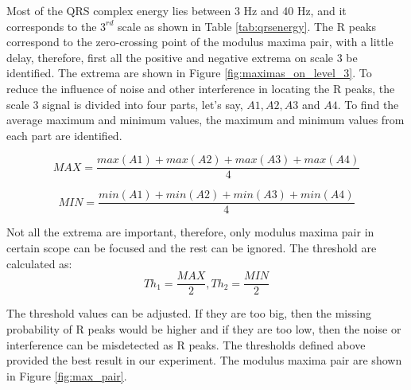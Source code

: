 Most of the QRS complex energy lies between 3 Hz and 40 Hz, and it corresponds to the $3^{rd}$ scale as shown in Table \ref{tab:qrsenergy}. The R peaks correspond to the zero-crossing point of the modulus maxima pair, with a little delay, therefore, first all the positive and negative extrema on scale 3 be identified. The extrema are shown in Figure \ref{fig:maximas_on_level_3}.  To reduce the influence of noise and other interference in locating the R peaks, the scale 3 signal is divided into four parts, let's say, $A1, A2, A3$ and $A4$. To find the average maximum and minimum values, the maximum and minimum values from each part are identified.


\begin{equation} 
{ MAX = \frac{max(A1) + max(A2) + max(A3) + max(A4)}{4}}
\end{equation}


\begin{equation} 
{ MIN = \frac{min(A1) + min(A2) + min(A3) + min(A4)}{4}}
\end{equation}


Not all the extrema are important, therefore, only modulus maxima pair in certain scope can be focused and the rest can be ignored. The threshold are calculated as:
\begin{equation}  \label{eqn:thresholds}
{ Th_1 = \frac{MAX}{2}} , { Th_2 = \frac{MIN}{2}} 
\end{equation}

The threshold values can be adjusted. If they are too big, then the missing probability of R peaks would be higher and if they are too low, then the noise or interference can be misdetected as R peaks. The thresholds defined above provided the best result in our experiment. The modulus maxima pair are shown in Figure \ref{fig:max_pair}.

